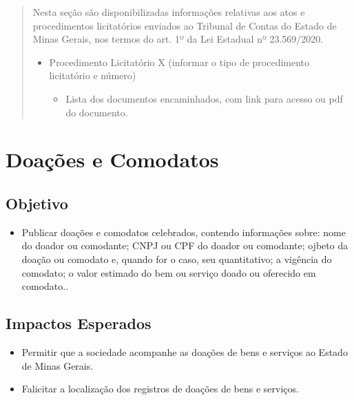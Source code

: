 \documentclass[]{book}
\providecommand{\tightlist}{%
  \setlength{\itemsep}{0pt}\setlength{\parskip}{0pt}}
\begin{document}
\begin{quote}
Nesta seção são disponibilizadas informações relativas aos atos e procedimentos licitatórios enviados ao Tribunal de Contas do Estado de Minas Gerais, nos termos do art. 1º da Lei Estadual nº 23.569/2020.

\begin{itemize}
\tightlist
\item
  Procedimento Licitatório X (informar o tipo de procedimento licitatório e número)

  \begin{itemize}
  \tightlist
  \item
    Lista dos documentos encaminhados, com link para acesso ou pdf do documento.
  \end{itemize}
\end{itemize}
\end{quote}

\hypertarget{doauxe7uxf5es-e-comodatos}{%
\section{Doações e Comodatos}\label{doauxe7uxf5es-e-comodatos}}

\hypertarget{objetivo-11}{%
\subsection{Objetivo}\label{objetivo-11}}

\begin{itemize}
\tightlist
\item
  Publicar doações e comodatos celebrados, contendo informações sobre: nome do doador ou comodante; CNPJ ou CPF do doador ou comodante; ojbeto da doação ou comodato e, quando for o caso, seu quantitativo; a vigência do comodato; o valor estimado do bem ou serviço doado ou oferecido em comodato..
\end{itemize}

\hypertarget{impactos-esperados-12}{%
\subsection{Impactos Esperados}\label{impactos-esperados-12}}

\begin{itemize}
\tightlist
\item
  Permitir que a sociedade acompanhe as doações de bens e serviços ao Estado de Minas Gerais.
\item
  Falicitar a localização dos registros de doações de bens e serviços.
\end{itemize}
\end{document}
